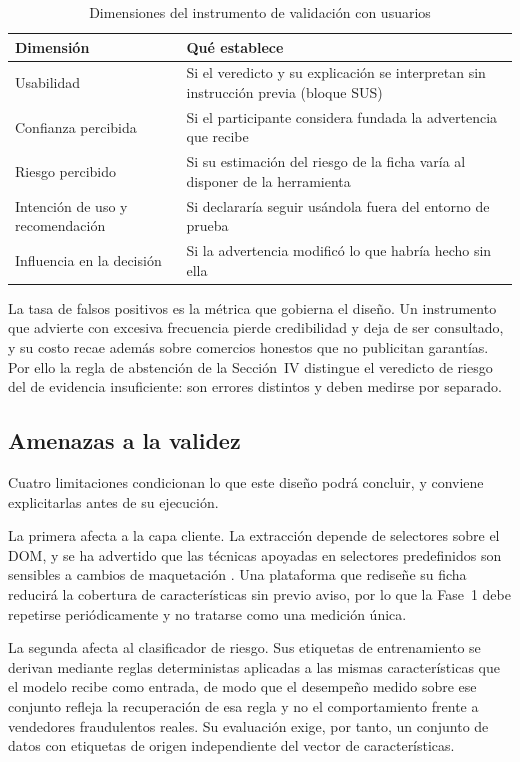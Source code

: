 \begin{table}[t]
\caption{Dimensiones del instrumento de validación con usuarios}
\label{tab:instrumento}
\centering
\footnotesize
\setlength{\tabcolsep}{3.5pt}
\renewcommand{\arraystretch}{1.15}
\begin{tabular}{@{}p{2.35cm}p{5.3cm}@{}}
\toprule
\textbf{Dimensión} & \textbf{Qué establece} \\
\midrule
Usabilidad & Si el veredicto y su explicación se interpretan sin instrucción previa (bloque SUS) \\
Confianza percibida & Si el participante considera fundada la advertencia que recibe \\
Riesgo percibido & Si su estimación del riesgo de la ficha varía al disponer de la herramienta \\
Intención de uso y recomendación & Si declararía seguir usándola fuera del entorno de prueba \\
Influencia en la decisión & Si la advertencia modificó lo que habría hecho sin ella \\
\bottomrule
\end{tabular}
\end{table}

La tasa de falsos positivos es la métrica que gobierna el diseño. Un instrumento que
advierte con excesiva frecuencia pierde credibilidad y deja de ser consultado, y su costo recae además sobre
comercios honestos que no publicitan garantías. Por ello la regla de abstención de la
Sección~IV distingue el veredicto de riesgo del de evidencia insuficiente: son errores
distintos y deben medirse por separado.

\subsection{Amenazas a la validez}

Cuatro limitaciones condicionan lo que este diseño podrá concluir, y conviene explicitarlas
antes de su ejecución.

La primera afecta a la capa cliente. La extracción depende de selectores sobre el DOM, y se
ha advertido que las técnicas apoyadas en selectores predefinidos son sensibles a cambios de
maquetación \cite{ref24}. Una plataforma
que rediseñe su ficha reducirá la cobertura de características sin previo aviso, por lo que la
Fase~1 debe repetirse periódicamente y no tratarse como una medición única.

La segunda afecta al clasificador de riesgo. Sus etiquetas de entrenamiento se derivan
mediante reglas deterministas aplicadas a las mismas características que el modelo recibe como
entrada, de modo que el desempeño medido sobre ese conjunto refleja la recuperación de esa
regla y no el comportamiento frente a vendedores fraudulentos reales. Su evaluación exige, por
tanto, un conjunto de datos con etiquetas de origen independiente del vector de
características.

